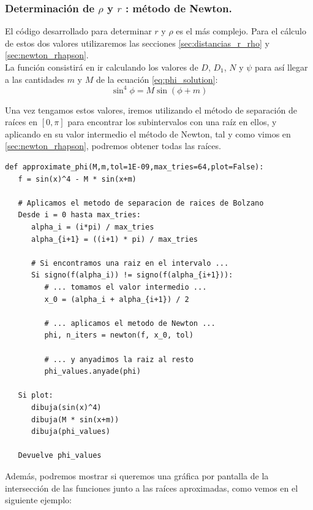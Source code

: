 \subsubsection{Determinación de $\rho$ y $r$ : método de Newton.}
El código desarrollado para determinar $r$ y $\rho$ es el más complejo. Para el cálculo de estos dos valores utilizaremos las secciones \ref{sec:distancias_r_rho} y \ref{sec:newton_rhapson}.\\

La función consistirá en ir calculando los valores de $D$, $D_1$, $N$ y $\psi$ para así llegar a las cantidades $m$ y $M$ de la ecuación \eqref{eq:phi_solution}:
\[
\sin^4{\phi}=M\sin{(\phi+m)}
\]

Una vez tengamos estos valores, iremos utilizando el método de separación de raíces en $[0,\pi]$ para encontrar los subintervalos con una raíz en ellos, y aplicando en su valor intermedio el método de Newton, tal y como vimos en \ref{sec:newton_rhapson}, podremos obtener todas las raíces.
\begin{lstlisting}[style=PythonCode]
def approximate_phi(M,m,tol=1E-09,max_tries=64,plot=False):	
   f = sin(x)^4 - M * sin(x+m)
   
   # Aplicamos el metodo de separacion de raices de Bolzano
   Desde i = 0 hasta max_tries:
      alpha_i = (i*pi) / max_tries
      alpha_{i+1} = ((i+1) * pi) / max_tries
      
      # Si encontramos una raiz en el intervalo ...
      Si signo(f(alpha_i)) != signo(f(alpha_{i+1})):
         # ... tomamos el valor intermedio ...
         x_0 = (alpha_i + alpha_{i+1}) / 2
         
         # ... aplicamos el metodo de Newton ...
         phi, n_iters = newton(f, x_0, tol)
         
         # ... y anyadimos la raiz al resto
         phi_values.anyade(phi)
   
   Si plot:
      dibuja(sin(x)^4)
      dibuja(M * sin(x+m))
      dibuja(phi_values)
   
   Devuelve phi_values
\end{lstlisting}

Además, podremos mostrar si queremos una gráfica por pantalla de la intersección de las funciones junto a las raíces aproximadas, como vemos en el siguiente ejemplo:


